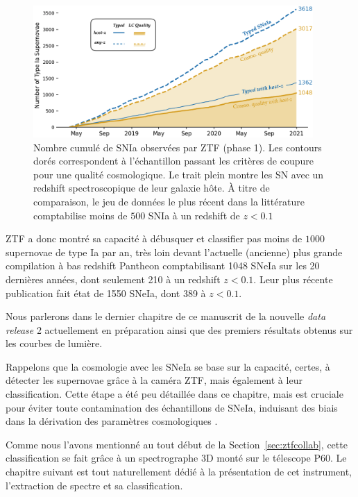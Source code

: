 \documentclass[../main/main.tex]{subfiles}
\begin{document}
\begin{figure}[h]
  \centering
  \includegraphics[width=0.95\textwidth]{../figures/02_ztf/cumulsniaztf.png}
  \caption[Nombre cumulé de SNIa observés par ZTF (phase 1)]{Nombre
    cumulé de SNIa observées par ZTF (phase 1). Les contours dorés
    correspondent à l'échantillon passant les critères de coupure pour
    une qualité cosmologique. Le trait plein montre les SN avec un
    redshift spectroscopique de leur galaxie hôte. À titre de
    comparaison, le jeu de données le plus récent dans la littérature
    comptabilise moins de $500$ SNIa à un redshift de $z<0.1$}
  \label{fig:cumulsniaztf}
\end{figure}

ZTF a donc montré sa capacité à débusquer et classifier pas moins de
$1000$ supernovae de type Ia par an, très loin devant l'actuelle (ancienne)
plus grande compilation à bas redshift Pantheon \citep{Scolnicpantheon18} comptabilisant 1048 SNeIa
sur les 20 dernières années, dont seulement 210 à un redshift
$z<0.1$. Leur plus récente publication
\citep[Pantheon+,][]{Scolnicpantheon21} fait état de 1550 SNeIa, dont 389 à $z<0.1$.

Nous parlerons dans le dernier chapitre de ce manuscrit de la nouvelle
\textit{data release} 2 actuellement en préparation ainsi que des premiers résultats obtenus sur les courbes de
lumière.

Rappelons que la cosmologie avec les SNeIa se base sur la capacité, certes, à
détecter les supernovae grâce à la caméra ZTF, mais également à leur
classification. Cette étape a été peu détaillée dans ce chapitre, mais
est cruciale pour éviter toute contamination des échantillons de SNeIa,
induisant des biais dans la dérivation des paramètres cosmologiques
\citep{JonesScolnic17SNcontam}.

Comme nous l'avons mentionné au tout
début de la Section~\ref{sec:ztfcollab}, cette classification se fait
grâce à un spectrographe 3D monté sur le télescope P60. Le chapitre
suivant est tout naturellement dédié à la présentation de cet
instrument, l'extraction de spectre et sa classification.


%
%
\end{document}
